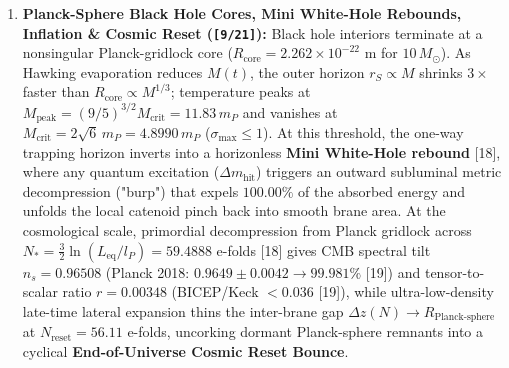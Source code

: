 \documentclass[10pt,a4paper]{article}
\begin{document}
\begin{enumerate}
preserving the Equivalence Principle ($|\Delta p - \Delta e| = 0.00$) while partitioning the universe into congested gravitational attraction $\Omega_{\text{attract}} = 0.31350$ and uncongested void relaxation $\Omega_{\text{repulse}} = 0.68641$ ($99.75\%$ Planck $\Omega_\Lambda = 0.6847$ [19]), with turnaround radius $R_{\text{turn}} = 2.971\text{ Mpc}$.
\item \textbf{Planck-Sphere Black Hole Cores, Mini White-Hole Rebounds, Inflation \& Cosmic Reset (\texttt{[9/21]}):} Black hole interiors terminate at a nonsingular Planck-gridlock core ($R_{\text{core}} = 2.262 \times 10^{-22}\text{ m}$ for $10\,M_\odot$). As Hawking evaporation reduces $M(t)$, the outer horizon $r_S \propto M$ shrinks $3\times$ faster than $R_{\text{core}} \propto M^{1/3}$; temperature peaks at $M_{\text{peak}} = (9/5)^{3/2}M_{\text{crit}} = 11.83\,m_P$ and vanishes at $M_{\text{crit}} = 2\sqrt{6}\,m_P = 4.8990\,m_P$ ($\sigma_{\max} \le 1$). At this threshold, the one-way trapping horizon inverts into a horizonless \textbf{Mini White-Hole rebound} [18], where any quantum excitation ($\Delta m_{\text{hit}}$) triggers an outward subluminal metric decompression ("burp") that expels $100.00\%$ of the absorbed energy and unfolds the local catenoid pinch back into smooth brane area. At the cosmological scale, primordial decompression from Planck gridlock across $N_* = \frac{3}{2}\ln(L_{\text{eq}}/l_P) = 59.4888$ e-folds [18] gives CMB spectral tilt $n_s = 0.96508$ (Planck 2018: $0.9649 \pm 0.0042 \to \mathbf{99.981\%}$ [19]) and tensor-to-scalar ratio $r = 0.00348$ (BICEP/Keck $< 0.036$ [19]), while ultra-low-density late-time lateral expansion thins the inter-brane gap $\Delta z(N) \to R_{\text{Planck-sphere}}$ at $N_{\text{reset}} = 56.11$ e-folds, uncorking dormant Planck-sphere remnants into a cyclical \textbf{End-of-Universe Cosmic Reset Bounce}.
\end{enumerate}
\end{document}
